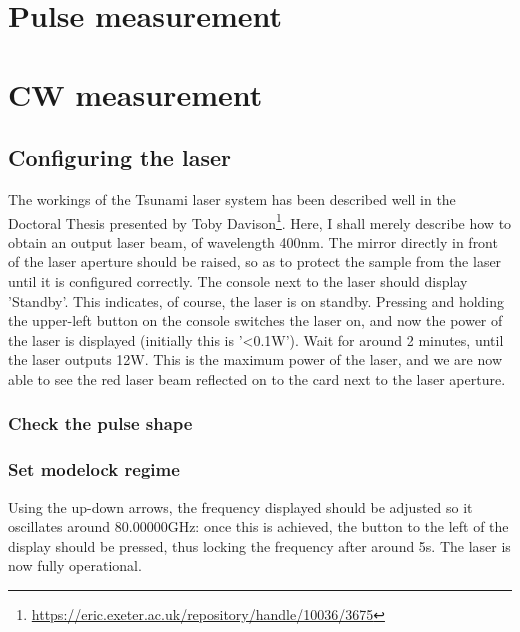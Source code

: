 \documentclass[14pt,a4paper] {article}
\begin{document}
\newpage

\section{Pulse measurement}

\section{CW measurement}


\subsection{Configuring the laser}

The workings of the Tsunami laser system has been described well in the Doctoral Thesis presented by Toby Davison\footnote{\url{https://eric.exeter.ac.uk/repository/handle/10036/3675}}. Here, I shall merely describe how to obtain an output laser beam, of wavelength 400nm. The mirror directly in front of the laser aperture should be raised, so as to protect the sample from the laser until it is configured correctly. The console next to the laser should display 'Standby'. This indicates, of course, the laser is on standby. Pressing and holding the upper-left button on the console switches the laser on, and now the power of the laser is displayed (initially this is '<0.1W'). Wait for around 2 minutes, until the laser outputs 12W. This is the maximum power of the laser, and we are now able to see the red laser beam reflected on to the card next to the laser aperture.


\subsubsection{Check the pulse shape}



\subsubsection{Set modelock regime}
 Using the up-down arrows, the frequency displayed should be adjusted so it oscillates around 80.00000GHz: once this is achieved, the button to the left of the display should be pressed, thus locking the frequency after around 5s. The laser is now fully operational.
\end{document}
